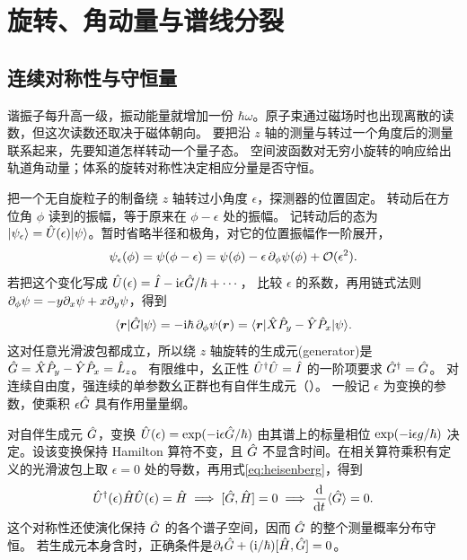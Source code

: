\chapter{旋转、角动量与谱线分裂}
\label{ch:angular}

\section{连续对称性与守恒量}

谐振子每升高一级，振动能量就增加一份 $\hbar\omega$。原子束通过磁场时也出现离散的读数，但这次读数还取决于磁体朝向。
要把沿 $z$ 轴的测量与转过一个角度后的测量联系起来，先要知道怎样转动一个量子态。
空间波函数对无穷小旋转的响应给出轨道角动量；体系的旋转对称性决定相应分量是否守恒。

把一个无自旋粒子的制备绕 $z$ 轴转过小角度 $\epsilon$，探测器的位置固定。
转动后在方位角 $\phi$ 读到的振幅，等于原来在 $\phi - \epsilon$ 处的振幅。
记转动后的态为 $\lvert\psi_\epsilon\rangle = \hat{U}(\epsilon)\lvert\psi\rangle$。暂时省略半径和极角，对它的位置振幅作一阶展开，
\begin{equation}
    \psi_\epsilon(\phi) = \psi(\phi - \epsilon)
        = \psi(\phi) - \epsilon\,\partial_\phi\psi(\phi) + \mathcal{O}(\epsilon^2).
\end{equation}
若把这个变化写成 $\hat{U}(\epsilon) = \hat{I} - \mathrm{i}\epsilon \hat{G}/\hbar + \cdots$，
比较 $\epsilon$ 的系数，再用链式法则 $\partial_\phi\psi = -y\partial_x\psi + x\partial_y\psi$，得到
\begin{equation}
    \langle\bm r\vert\hat{G}\vert\psi\rangle = -\mathrm{i}\hbar\,\partial_\phi\psi(\bm r)
        = \langle\bm r\vert\hat{X}\hat{P}_y - \hat{Y}\hat{P}_x\vert\psi\rangle.
\end{equation}
这对任意光滑波包都成立，所以绕 $z$ 轴旋转的生成元(generator)是 $\hat{G} = \hat{X}\hat{P}_y - \hat{Y}\hat{P}_x = \hat{L}_z$。
有限维中，幺正性 $\hat{U}^\dagger \hat{U} = \hat{I}$ 的一阶项要求 $\hat{G}^\dagger = \hat{G}$。
对连续自由度，强连续的单参数幺正群也有自伴生成元（）。
一般记 $\epsilon$ 为变换的参数，使乘积 $\epsilon \hat{G}$ 具有作用量量纲。

对自伴生成元 $\hat{G}$，变换 $\hat{U}(\epsilon) = \exp(-\mathrm{i}\epsilon\hat{G}/\hbar)$ 由其谱上的标量相位 $\exp(-\mathrm{i}\epsilon g/\hbar)$ 决定。设该变换保持 Hamilton 算符不变，且 $\hat{G}$ 不显含时间。在相关算符乘积有定义的光滑波包上取 $\epsilon = 0$ 处的导数，再用式\eqref{eq:heisenberg}，得到
\begin{equation}
    \hat{U}^\dagger(\epsilon)\hat{H}\hat{U}(\epsilon) = \hat{H}
    \implies [\hat{G},\hat{H}] = 0
    \implies \frac{\mathop{}\!\mathrm{d}^{}}{\mathrm{d}{t}^{}}\langle\hat{G}\rangle = 0 .
\end{equation}
这个对称性还使演化保持 $\hat{G}$ 的各个谱子空间，因而 $\hat{G}$ 的整个测量概率分布守恒。
若生成元本身含时，正确条件是$\partial_t\hat{G} + (\mathrm{i}/\hbar)[\hat{H},\hat{G}] = 0$。

